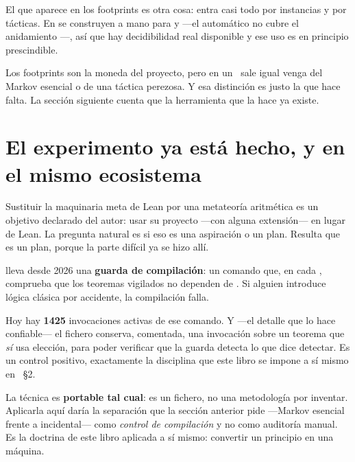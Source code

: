 El  que aparece en los footprints es otra cosa: entra casi todo por
instancias  y por tácticas. En
 se construyen a mano  para
 y  —el  automático no cubre el anidamiento
—, así que hay decidibilidad real disponible y ese uso es en
principio prescindible.

\begin{muro}
Los footprints son la moneda del proyecto, pero  en un \printaxioms\ sale
igual venga del Markov esencial o de una táctica perezosa. Y esa distinción es justo la que hace
falta. La sección siguiente cuenta que la herramienta que la hace ya existe.
\end{muro}

\section{El experimento ya está hecho, y en el mismo ecosistema}

Sustituir la maquinaria meta de Lean por una metateoría aritmética es un objetivo declarado del
autor: usar su proyecto  —con alguna extensión— en lugar de Lean. La pregunta
natural es si eso es una aspiración o un plan. Resulta que es un plan, porque la parte difícil ya
se hizo allí.

 lleva desde 2026 una \textbf{guarda de compilación}: un comando que, en cada
 , comprueba que los teoremas vigilados no dependen de
. Si alguien introduce lógica clásica por accidente, la compilación falla.


Hoy hay \textbf{1425} invocaciones activas de ese comando. Y —el detalle que lo hace confiable— el
fichero conserva, comentada, una invocación sobre un teorema que \emph{sí} usa elección, para poder
verificar que la guarda detecta lo que dice detectar. Es un control positivo, exactamente la
disciplina que este libro se impone a sí mismo en ~§2.

\begin{leccion}
La técnica es \textbf{portable tal cual}: es un fichero, no una metodología por inventar.
Aplicarla aquí daría la separación que la sección anterior pide —Markov esencial frente a
 incidental— como \emph{control de compilación} y no como auditoría manual. Es la
doctrina de este libro aplicada a sí mismo: convertir un principio en una máquina.
\end{leccion}

